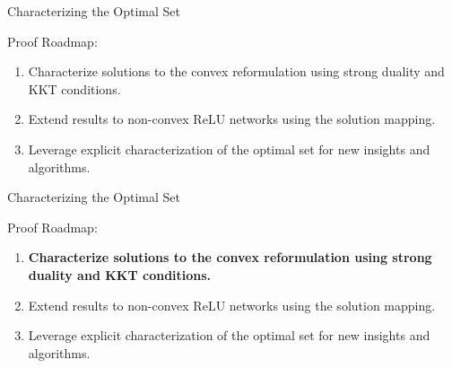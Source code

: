 \documentclass[usenames,dvipsnames,mathserif,notheorems]{beamer}
\newcommand{\bad}[1]{\textcolor{bad}{#1}}
\newcommand{\good}[1]{\textcolor{good}{#1}}
\begin{document}
\begin{frame}{Characterizing the Optimal Set}

	{
		\large
		{\Large
			Proof Roadmap:
		}
		\vspace{2em}
		\begin{enumerate}
			\large
			\item \pause
			      Characterize solutions to the \good{convex reformulation}
			      using strong duality and KKT conditions.
			      \vspace{1ex}
			      \pause
			\item Extend results to \bad{non-convex} ReLU networks
			      using the solution mapping.
			      \vspace{1ex}
			      \pause
			\item Leverage explicit characterization of the optimal
			      set for \good{new insights and algorithms}.
		\end{enumerate}
	}


\end{frame}

\begin{frame}{Characterizing the Optimal Set}

	{
		\large
		{\Large
			Proof Roadmap:
		}
		\vspace{2em}
		\begin{enumerate}
			\large
			\item \textbf{Characterize solutions to the \good{convex reformulation}
				      using strong duality and KKT conditions.}
			      \vspace{1ex}
			\item Extend results to \bad{non-convex} ReLU networks
			      using the solution mapping.
			      \vspace{1ex}
			\item Leverage explicit characterization of the optimal
			      set for \good{new insights and algorithms}.
		\end{enumerate}
	}

\end{frame}
\end{document}
